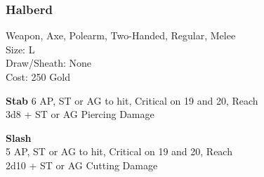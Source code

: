 \subsubsection{Halberd}\label{weapon:halberd}
Weapon, Axe, Polearm, Two-Handed, Regular, Melee\\
Size: L\\
Draw/Sheath: None\\
Cost: 250 Gold

\textbf{Stab}
6 AP, ST or AG to hit, Critical on 19 and 20,  Reach\\
3d8 + \texttimes ST or AG Piercing Damage

\textbf{Slash}\\
5 AP, ST or AG to hit, Critical on 19 and 20,  Reach\\
2d10 + \texttimes ST or AG Cutting Damage

